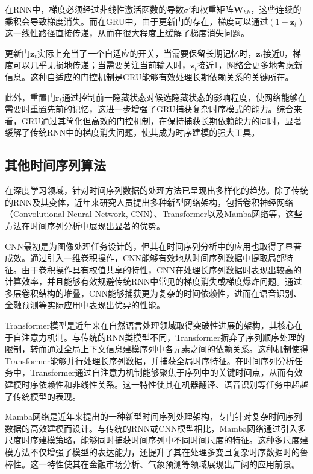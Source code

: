 在RNN中，梯度必须经过非线性激活函数的导数$\sigma'$和权重矩阵$\mathbf{W}_{hh}$，这些连续的乘积会导致梯度消失。而在GRU中，由于更新门的存在，梯度可以通过$(1 - \mathbf{z}_t)$这一线性路径直接传递，从而在很大程度上缓解了梯度消失问题。

更新门$\mathbf{z}_t$实际上充当了一个自适应的开关，当需要保留长期记忆时，$\mathbf{z}_t$接近0，梯度可以几乎无损地传递；当需要关注当前输入时，$\mathbf{z}_t$接近1，网络会更多地考虑新信息。这种自适应的门控机制是GRU能够有效处理长期依赖关系的关键所在。

此外，重置门$\mathbf{r}_t$通过控制前一隐藏状态对候选隐藏状态的影响程度，使网络能够在需要时重置先前的记忆，这进一步增强了GRU捕获复杂时序模式的能力。综合来看，GRU通过其简化但高效的门控机制，在保持捕获长期依赖能力的同时，显著缓解了传统RNN中的梯度消失问题，使其成为时序建模的强大工具。
\subsection{其他时间序列算法}
在深度学习领域，针对时间序列数据的处理方法已呈现出多样化的趋势。除了传统的RNN及其变体，近年来研究人员提出多种新型网络架构，包括卷积神经网络（Convolutional Neural Network, CNN）、Transformer以及Mamba网络等，这些方法在时间序列分析中展现出显著的优势。

CNN最初是为图像处理任务设计的，但其在时间序列分析中的应用也取得了显著成效\cite{lecun1998gradient}。通过引入一维卷积操作，CNN能够有效地从时间序列数据中提取局部特征。由于卷积操作具有权值共享的特性，CNN在处理长序列数据时表现出较高的计算效率，并且能够有效规避传统RNN中常见的梯度消失或梯度爆炸问题。通过多层卷积结构的堆叠，CNN能够捕获更为复杂的时间依赖性，进而在语音识别、金融预测等实际应用中表现出优异的性能\cite{li2021survey}。

Transformer模型是近年来在自然语言处理领域取得突破性进展的架构，其核心在于自注意力机制\cite{Vaswanietal2017Attention}。与传统的RNN类模型不同，Transformer摒弃了序列顺序处理的限制，转而通过全局上下文信息建模序列中各元素之间的依赖关系。这种机制使得Transformer能够并行处理长序列数据，并捕获全局时序特征。在时间序列分析任务中，Transformer通过自注意力机制能够聚焦于序列中的关键时间点，从而有效建模时序依赖性和非线性关系。这一特性使其在机器翻译、语音识别等任务中超越了传统模型的表现。

Mamba网络是近年来提出的一种新型时间序列处理架构，专门针对复杂时间序列数据的高效建模而设计\cite{gu2024mamba}。与传统的RNN或CNN模型相比，Mamba网络通过引入多尺度时序建模策略，能够同时捕获时间序列中不同时间尺度的特征。这种多尺度建模方法不仅增强了模型的表达能力，还提升了其在处理多变且复杂时序数据时的鲁棒性。这一特性使其在金融市场分析、气象预测等领域展现出广阔的应用前景。

